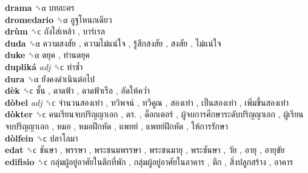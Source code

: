 \textbf{drama} ␝α   บทละคร   \\
\textbf{dromedario} ␝α   อูฐโหนกเดียว   \\
\textbf{drùm} ␝ϲ   ถังใส่เหล้า ,  บาร์เรล   \\
\textbf{duda} ␝α   ความสงสัย ,  ความไม่แน่ใจ ,  รู้สึกสงสัย ,  สงสัย ,  ไม่แน่ใจ   \\
\textbf{duke} ␝α   ดยุค ,  ท่านดยุค   \\
\textbf{dupliká} \emph{adj}  ␝ϲ   ทำซ้ำ   \\
\textbf{dura} ␝α   ยังคงดำเนินต่อไป   \\
\textbf{dèk} ␝ϲ   ชั้น ,  ดาดฟ้า ,  ดาดฟ้าเรือ ,  อัดให้คว่ำ   \\
\textbf{dòbel} \emph{adj}  ␝ϲ   จำนวนสองเท่า ,  ทวิพจน์ ,  ทวีคูณ ,  สองเท่า ,  เป็นสองเท่า ,  เพิ่มขึ้นสองเท่า   \\
\textbf{dòkter} ␝ϲ   คนเรียนจบปริญญาเอก ,  ดร. ,  ด็อกเตอร์ ,  ผู้จบการศึกษาระดับปริญญาเอก ,  ผู้เรียนจบปริญญาเอก ,  หมอ ,  หมอฝึกหัด ,  แพทย์ ,  แพทย์ฝึกหัด ,  ให้การรักษา   \\
\textbf{dòlfein} ␝ϲ   ปลาโลมา   \\
\textbf{edat} ␝ϲ   ชันษา ,  พรรษา ,  พระชนมพรรษา ,  พระชนมายุ ,  พระชันษา ,  วัย ,  อายุ ,  อายุขัย   \\
\textbf{edifisio} ␝ϲ   กลุ่มผู้อยู่อาศัยในตึกที่พัก ,  กลุ่มผู้อยู่อาศัยในอาคาร ,  ตึก ,  สิ่งปลูกสร้าง ,  อาคาร   \\
